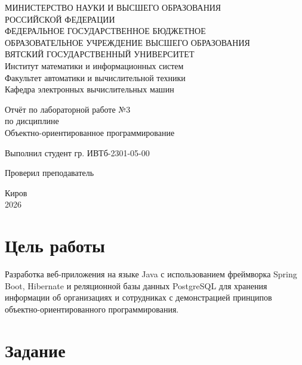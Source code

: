 \documentclass[oneside,a4paper,14pt]{extarticle}
\begin{document}
\newpage\thispagestyle{empty}
\begin{center}
    МИНИСТЕРСТВО НАУКИ И ВЫСШЕГО ОБРАЗОВАНИЯ\\
    РОССИЙСКОЙ ФЕДЕРАЦИИ\\
    ФЕДЕРАЛЬНОЕ ГОСУДАРСТВЕННОЕ БЮДЖЕТНОЕ\\
    ОБРАЗОВАТЕЛЬНОЕ УЧРЕЖДЕНИЕ ВЫСШЕГО ОБРАЗОВАНИЯ\\
    ВЯТСКИЙ ГОСУДАРСТВЕННЫЙ УНИВЕРСИТЕТ\\
    Институт математики и информационных систем\\
    Факультет автоматики и вычислительной техники\\
    Кафедра электронных вычислительных машин
\end{center}

\vspace{20mm}
\begin{center}

    Отчёт по лабораторной работе №3\\
    по дисциплине\\
    Объектно-ориентированное программирование\\
\end{center}
\vfill

Выполнил студент гр. ИВТб-2301-05-00 \hfill
{}

Проверил преподаватель\hfill
{}

\vfill
\begin{center}
    Киров\\
    2026
\end{center}

\newpage

\section*{Цель работы}
Разработка веб-приложения на языке Java с использованием фреймворка Spring Boot, Hibernate и реляционной базы данных PostgreSQL для хранения информации об организациях и сотрудниках с демонстрацией принципов объектно-ориентированного программирования.

\section*{Задание}
\end{document}
